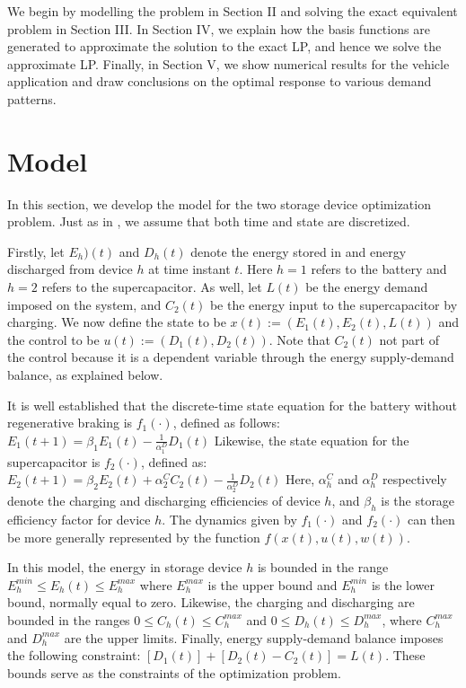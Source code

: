 \documentclass[conference]{IEEEtran}
\begin{document}
We begin by modelling the problem in Section II and solving the exact equivalent problem in Section III. In Section IV, we explain how the basis functions are generated to approximate the solution to the exact LP, and hence we solve the approximate LP. Finally, in Section V, we show numerical results for the vehicle application and draw conclusions on the optimal response to various demand patterns. 

\section{Model}
In this section, we develop the model for the two storage device optimization problem. Just as in \cite{su2013modeling}, we assume that both time and state are discretized.

Firstly, let $E_{h})(t)$ and $D_{h}(t)$ denote the energy stored in and energy discharged from device $h$ at time instant $t$. Here $h=1$ refers to the battery and $h=2$ refers to the supercapacitor. As well, let $L(t)$ be the energy demand imposed on the system, and $C_{2}(t)$ be the energy input to the supercapacitor by charging. We now define the state to be $x(t):=(E_{1}(t),E_{2}(t),L(t))$ and the control to be $u(t):=(D_{1}(t),D_{2}(t))$. Note that $C_{2}(t)$ not part of the control because it is a dependent variable through the energy supply-demand balance, as explained below.

It is well established that the discrete-time state equation for the battery without regenerative braking is $f_{1}(\cdot)$, defined as follows:
\begin{math}E_{1}(t+1)=\beta_{1}E_{1}(t)-\frac{1}{\alpha_{1}^{D}}D_{1}(t)\end{math} Likewise, the state equation for the supercapacitor is $f_{2}(\cdot)$, defined as:
\begin{math}E_{2}(t+1)=\beta_{2}E_{2}(t)+\alpha_{2}^{C}C_{2}(t)-\frac{1}{\alpha_{2}^{D}}D_{2}(t)\end{math} Here, $\alpha^{C}_{h}$ and $\alpha^{D}_{h}$ respectively denote the charging and discharging efficiencies of device $h$, and $\beta_{h}$ is the storage efficiency factor for device $h$. The dynamics given by $f_{1}(\cdot)$ and $f_{2}(\cdot)$ can then be more generally represented by the function $f(x(t),u(t),w(t))$.

In this model, the energy in storage device $h$ is bounded in the range $E_{h}^{min}\leq E_{h}(t)\leq E_{h}^{max}$ where $E_{h}^{max}$ is the upper bound and $E_{h}^{min}$ is the lower bound, normally equal to zero. Likewise, the charging and discharging are bounded in the ranges $0\leq C_{h}(t)\leq C_{h}^{max}$ and $0\leq D_{h}(t)\leq D_{h}^{max}$, where $C_{h}^{max}$ and $D_{h}^{max}$ are the upper limits. Finally, energy supply-demand balance imposes the following constraint: $\left[D_{1}(t)\right] + \left[D_{2}(t) - C_{2}(t)\right] = L(t)$. These bounds serve as the constraints of the optimization problem.
\end{document}
